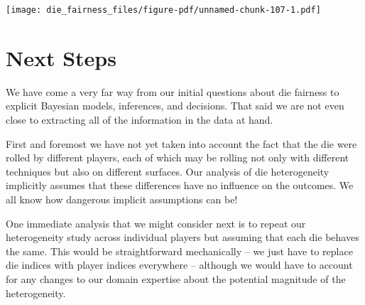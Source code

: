 \documentclass[
  letterpaper,
  DIV=11,
  numbers=noendperiod]{scrartcl}
\newenvironment{Shaded}{\begin{snugshade}}{\end{snugshade}}
\newcommand{\AttributeTok}[1]{\textcolor[rgb]{0.40,0.45,0.13}{#1}}
\newcommand{\ControlFlowTok}[1]{\textcolor[rgb]{0.00,0.23,0.31}{#1}}
\newcommand{\DecValTok}[1]{\textcolor[rgb]{0.68,0.00,0.00}{#1}}
\newcommand{\FloatTok}[1]{\textcolor[rgb]{0.68,0.00,0.00}{#1}}
\newcommand{\FunctionTok}[1]{\textcolor[rgb]{0.28,0.35,0.67}{#1}}
\newcommand{\NormalTok}[1]{\textcolor[rgb]{0.00,0.23,0.31}{#1}}
\newcommand{\OtherTok}[1]{\textcolor[rgb]{0.00,0.23,0.31}{#1}}
\newcommand{\SpecialCharTok}[1]{\textcolor[rgb]{0.37,0.37,0.37}{#1}}
\newcommand{\StringTok}[1]{\textcolor[rgb]{0.13,0.47,0.30}{#1}}
\begin{document}
\begin{Shaded}
\end{Shaded}

\texttt{[image: die\_fairness\_files/figure-pdf/unnamed-chunk-107-1.pdf]}

\section{Next Steps}\label{next-steps}

We have come a very far way from our initial questions about die
fairness to explicit Bayesian models, inferences, and decisions. That
said we are not even close to extracting all of the information in the
data at hand.

First and foremost we have not yet taken into account the fact that the
die were rolled by different players, each of which may be rolling not
only with different techniques but also on different surfaces. Our
analysis of die heterogeneity implicitly assumes that these differences
have no influence on the outcomes. We all know how dangerous implicit
assumptions can be!

One immediate analysis that we might consider next is to repeat our
heterogeneity study across individual players but assuming that each die
behaves the same. This would be straightforward mechanically -- we just
have to replace die indices with player indices everywhere -- although
we would have to account for any changes to our domain expertise about
the potential magnitude of the heterogeneity.
\end{document}
